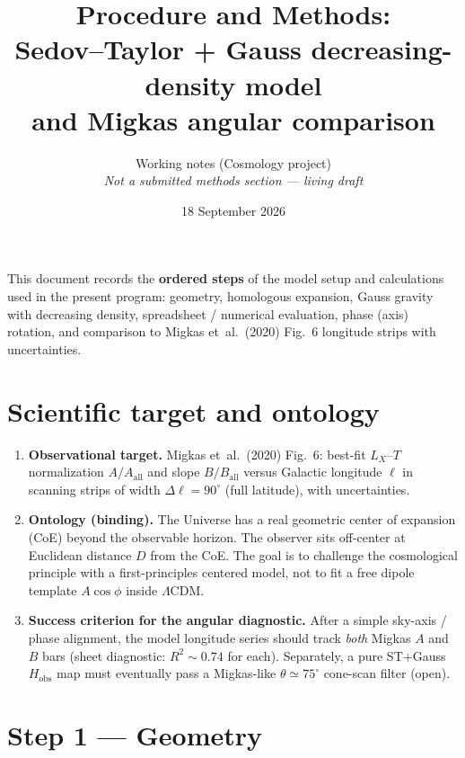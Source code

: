 \documentclass[11pt,a4paper]{article}
\title{Procedure and Methods:\\
Sedov--Taylor + Gauss decreasing-density model\\
and Migkas angular comparison}
\author{Working notes (Cosmology project)\\
\textit{Not a submitted methods section --- living draft}}
\date{18 September 2026}
\begin{document}
\maketitle

\noindent
This document records the \textbf{ordered steps} of the model setup and calculations used in the present program: geometry, homologous expansion, Gauss gravity with decreasing density, spreadsheet / numerical evaluation, phase (axis) rotation, and comparison to Migkas et~al.\ (2020) Fig.~6 longitude strips with uncertainties.

\section{Scientific target and ontology}

\begin{enumerate}[leftmargin=*]
\item \textbf{Observational target.} Migkas et~al.\ (2020) Fig.~6: best-fit \(L_X\)--\(T\) normalization \(A/A_{\mathrm{all}}\) and slope \(B/B_{\mathrm{all}}\) versus Galactic longitude \(\ell\) in scanning strips of width \(\Delta\ell=90^\circ\) (full latitude), with uncertainties.
\item \textbf{Ontology (binding).} The Universe has a real geometric center of expansion (CoE) beyond the observable horizon. The observer sits off-center at Euclidean distance \(D\) from the CoE. The goal is to challenge the cosmological principle with a first-principles centered model, not to fit a free dipole template \(A\cos\phi\) inside \(\Lambda\)CDM.
\item \textbf{Success criterion for the angular diagnostic.} After a simple sky-axis / phase alignment, the model longitude series should track \emph{both} Migkas \(A\) and \(B\) bars (sheet diagnostic: \(R^2\sim 0.74\) for each). Separately, a pure ST+Gauss \(H_{\mathrm{obs}}\) map must eventually pass a Migkas-like \(\theta\simeq 75^\circ\) cone-scan filter (open).
\end{enumerate}

\section{Step 1 --- Geometry}
\end{document}
